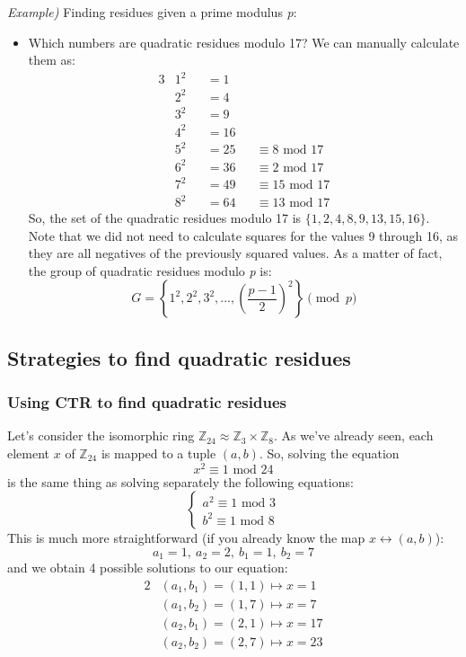 \documentclass[11pt, a4paper]{article}
\newcommand{\mymod}{
    \text{ mod }
}
\begin{document}
\textit{Example)} Finding residues given a prime modulus \textit{p}:
\begin{itemize}
    \item[] Which numbers are quadratic residues modulo 17?
    We can manually calculate them as:
    \begin{alignat*}{3}
        &1^2&&=1\\
        &2^2&&=4\\
        &3^2&&=9\\
        &4^2&&=16\\
        &5^2&&=25&&\equiv8\mymod17\\
        &6^2&&=36&&\equiv2\mymod17\\
        &7^2&&=49&&\equiv15\mymod17\\
        &8^2&&=64&&\equiv13\mymod17
    \end{alignat*}
    So, the set of the quadratic residues modulo 17 is $\{1,2,4,8,9,13,15,16\}$. Note that we did not need to calculate squares for the values 9 through 16, as they are all negatives of the previously squared values. As a matter of fact, the group of quadratic residues modulo \textit{p} is:
    $$G = \left\{1^2, 2^2, 3^2, ..., \left(\frac{p-1}{2}\right)^2\right\}\pmod{p}$$
\end{itemize}

\newpage
\subsection{Strategies to find quadratic residues}
\subsubsection{Using CTR to find quadratic residues}
Let's consider the isomorphic ring $\mathbb{Z}_{24}\approx\mathbb{Z}_3\times\mathbb{Z}_8$. As we've already seen, each element $x$ of $\mathbb{Z}_{24}$ is mapped to a tuple $(a,b)$. So, solving the equation
$$x^2\equiv1\mymod24$$
is the same thing as solving separately the following equations:
\begin{equation*}
    \begin{cases}
        a^2\equiv1\mymod3\\
        b^2\equiv1\mymod8
    \end{cases}
\end{equation*}
This is much more straightforward (if you already know the map $x\leftrightarrow(a,b)$):
$$a_1=1,\ a_2=2,\ b_1=1,\ b_2=7$$
and we obtain 4 possible solutions to our equation:
\begin{alignat*}{2}
    &(a_1,b_1)=(1,1)\mapsto x=1\\
    &(a_1,b_2)=(1,7)\mapsto x=7\\
    &(a_2,b_1)=(2,1)\mapsto x=17\\
    &(a_2,b_2)=(2,7)\mapsto x=23
\end{alignat*}
\end{document}
